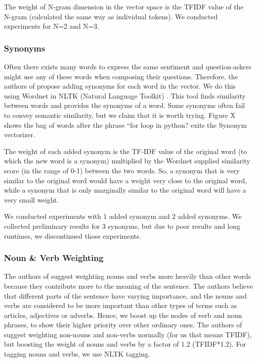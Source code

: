 \documentclass{acm_proc_article-sp}
\begin{document}
The weight of N-gram dimension in the vector space is the TFIDF value of the N-gram (calculated the same way as individual tokens). We conducted experiments for N=2 and N=3. 

\subsubsection{Synonyms}
Often there exists many words to express the same sentiment and question-askers might use any of these words when composing their questions. Therefore, the authors of \cite{liu2009searching} propose adding synonyms for each word in the vector. We do this using Wordnet in NLTK (Natural Language Toolkit) \cite{bird2009natural}. This tool finds similarity between words and provides the synonyms of a word. Some synonyms often fail to convey semantic similarity, but we claim that it is worth trying. Figure X shows the bag of words after the phrase ``for loop in python? exits the Synonym vectorizer. 

The weight of each added synonym is the TF-IDF value of the original word (to which the new word is a synonym) multiplied by the Wordnet supplied similarity  score (in the range of 0-1) between the two words. So, a synonym that is very similar to the original word would have a weight very close to the original word, while a synonym that is only marginally similar to the original word will have a very small weight.

We conducted experiments with 1 added synonym and 2 added synonyms. We collected preliminary results for 3 synonyms, but due to poor results and long runtimes, we discontinued those experiments.

\subsubsection{Noun \& Verb Weighting}
The authors of \cite{wang2009syntactic} suggest weighting nouns and verbs more heavily than other words because they contribute more to the meaning of the sentence. The authors believe that different parts of the sentence have varying importance, and the nouns and verbs are considered to be more important than other types of terms such as articles, adjectives or adverbs. Hence, we boost up the nodes of verb and noun phrases, to show their higher priority over other ordinary ones. The authors of \cite{wang2009syntactic} suggest weighting non-nouns and non-verbs normally (for us that means TFIDF), but boosting the weight of nouns and verbs by a factor of 1.2 (TFIDF*1.2). For tagging nouns and verbs, we use NLTK tagging.
\end{document}
